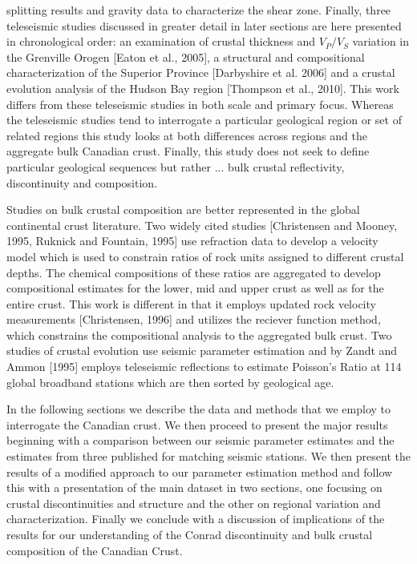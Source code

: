\documentclass[draft, 12pt]{article}
\begin{document}
splitting results and gravity data to characterize the shear zone. Finally, three teleseismic studies discussed in greater detail in later sections are here presented in chronological order: an examination of crustal thickness and $V_P/V_S$ variation in the Grenville Orogen [Eaton et al., 2005], a structural and compositional characterization of the Superior Province [Darbyshire et al. 2006] and a crustal evolution analysis of the Hudson Bay region [Thompson et al., 2010]. This work differs from these teleseismic studies in both scale and primary focus. Whereas the teleseismic studies tend to interrogate a particular geological region or set of related regions this study looks at both differences across regions and the aggregate bulk Canadian crust. Finally, this study does not seek to define particular geological sequences but rather ... bulk crustal reflectivity, discontinuity and composition.

Studies on bulk crustal composition are better represented in the global continental crust literature. Two widely cited studies [Christensen and Mooney, 1995, Ruknick and Fountain, 1995] use refraction data to develop a velocity model which is used to constrain ratios of rock units assigned to different crustal depths. The chemical compositions of these ratios are aggregated to develop compositional estimates for the lower, mid and upper crust as well as for the entire crust. This work is different in that it employs updated rock velocity measurements [Christensen, 1996] and utilizes the reciever function method, which constrains the compositional analysis to the aggregated bulk crust. Two studies of crustal evolution use seismic parameter estimation and  by Zandt and Ammon [1995] employs teleseismic reflections to estimate Poisson's Ratio at 114 global broadband stations which are then sorted by geological age.


In the following sections we describe the data and methods that we employ to interrogate the Canadian crust. We then proceed to present the major results beginning with a comparison between our seismic parameter estimates and the estimates from three published for matching seismic stations. We then present the results of a modified approach to our parameter estimation method and follow this with a presentation of the main dataset in two sections, one focusing on crustal discontinuities and structure and the other on regional variation and characterization. Finally we conclude with a discussion of implications of the results for our understanding of the Conrad discontinuity and bulk crustal composition of the Canadian Crust.
\end{document}
